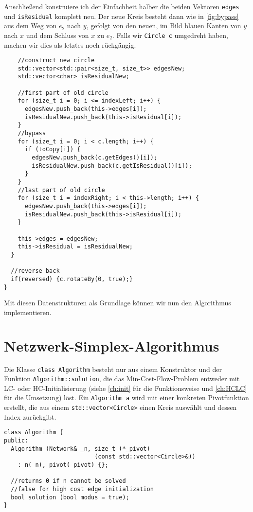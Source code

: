 Anschließend konstruiere ich der Einfachheit halber die beiden Vektoren \lstinline|edges| und \lstinline|isResidual| komplett neu. Der neue Kreis besteht dann wie in \cref{fig:bypass} aus dem Weg von $e_2$ nach $y$, gefolgt von den neuen, im Bild blauen Kanten von $y$ nach $x$ und dem Schluss von $x$ zu $e_2$. Falls wir \lstinline|Circle c| umgedreht haben, machen wir dies als letztes noch rückgängig.
    
\begin{lstlisting}
    //construct new circle
    std::vector<std::pair<size_t, size_t>> edgesNew;
    std::vector<char> isResidualNew;
    
    //first part of old circle
    for (size_t i = 0; i <= indexLeft; i++) {
      edgesNew.push_back(this->edges[i]);
      isResidualNew.push_back(this->isResidual[i]);
    }
    //bypass
    for (size_t i = 0; i < c.length; i++) {
      if (toCopy[i]) {
        edgesNew.push_back(c.getEdges()[i]);
        isResidualNew.push_back(c.getIsResidual()[i]);
      }
    }
    //last part of old circle
    for (size_t i = indexRight; i < this->length; i++) {
      edgesNew.push_back(this->edges[i]);
      isResidualNew.push_back(this->isResidual[i]);
    }
    
    this->edges = edgesNew;
    this->isResidual = isResidualNew;
  }

  //reverse back
  if(reversed) {c.rotateBy(0, true);}
}
\end{lstlisting}

Mit diesen Datenstrukturen als Grundlage können wir nun den Algorithmus implementieren.

\section{Netzwerk-Simplex-Algorithmus}
Die Klasse \lstinline|class Algorithm| besteht nur aus einem Konstruktor und der Funktion \lstinline|Algorithm::solution|, die das Min-Cost-Flow-Problem entweder mit LC- oder HC-Initialisierung (siehe \cref{ch:init} für die Funktionsweise und \cref{ch:HCLC} für die Umsetzung) löst. Ein \lstinline|Algorithm a| wird mit einer konkreten Pivotfunktion erstellt, die aus einem \lstinline|std::vector<Circle>| einen Kreis auswählt und dessen Index zurückgibt.
\begin{lstlisting}
class Algorithm {
public:
  Algorithm (Network& _n, size_t (*_pivot)
                          (const std::vector<Circle>&))
    : n(_n), pivot(_pivot) {};

  //returns 0 if n cannot be solved
  //false for high cost edge initialization
  bool solution (bool modus = true);
}
\end{lstlisting}

